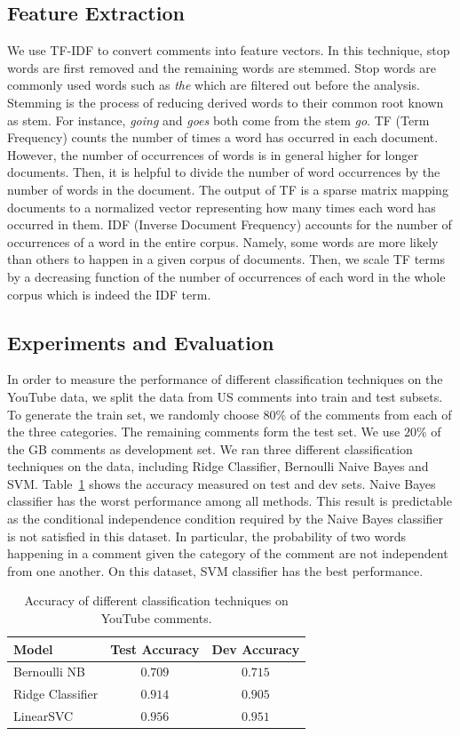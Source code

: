 \subsection{Feature Extraction}
\label{sec:feature}
We use TF-IDF to convert comments into feature vectors. In this technique, stop words are first removed and the remaining words are stemmed. Stop words are commonly used words such as \textit{the} which are filtered out before the analysis. Stemming is the process of reducing derived words to their common root known as stem. For instance, \textit{going} and \textit{goes} both come from the stem \textit{go}. TF (Term Frequency) counts the number of times a word has occurred in each document. However, the number of occurrences of words is in general higher for longer documents. Then, it is helpful to divide the number of word occurrences by the number of words in the document. The output of TF is a sparse matrix mapping documents to a normalized vector representing how many times each word has occurred in them. IDF (Inverse Document Frequency) accounts for the number of occurrences of a word in the entire corpus. Namely, some words are more likely than others to happen in a given corpus of documents. Then, we scale TF terms by a decreasing function of the number of occurrences of each word in the whole corpus which is indeed the IDF term.

\subsection{Experiments and Evaluation}
\label{sec:experiments}
In order to measure the performance of different classification techniques on the YouTube data, we split the data from US comments into train and test subsets. To generate the train set, we randomly choose $80\%$ of the comments from each of the three categories. The remaining comments form the test set. We use $20\%$ of the GB comments as development set. 
We ran three different classification techniques on the data, including Ridge Classifier, Bernoulli Naive Bayes and SVM. Table~\ref{tab:accuracy} shows the accuracy measured on test and dev sets. Naive Bayes classifier has the worst performance among all methods. This result is predictable as the conditional independence condition required by the Naive Bayes classifier is not satisfied in this dataset. In particular, the probability of two words happening in a comment given the category of the comment are not independent from one another. On this dataset, SVM classifier has the best performance.

\begin{table}%
\centering
\begin{tabular}{|l|c|c|}
\hline
Model & Test Accuracy & Dev Accuracy \\
\hline
Bernoulli NB & $0.709$ & $0.715$ \\
\hline
Ridge Classifier & $0.914$ & $0.905$ \\
\hline
LinearSVC & $0.956$ & $0.951$ \\
\hline
\end{tabular}
\caption{Accuracy of different classification techniques on YouTube comments.}
\label{tab:accuracy}
\end{table}